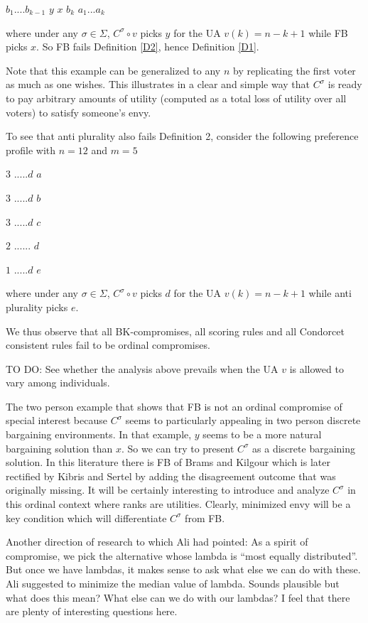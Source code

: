 \documentclass[version=3.21, pagesize, notitlepage, twoside=off, bibliography=totoc, DIV=calc, fontsize=12pt, a4paper]{scrartcl}
\begin{document}
$b_{1}....b_{k-1}$ $y$ $x$ $b_{k}$ $a_{1}...a_{k}$

\bigskip

where under any $\sigma \in \Sigma $, $C^{\sigma }\circ v$ picks $y$ for the
UA $v(k)=n-k+1$ while FB picks $x$. So FB fails Definition \ref{D2}, hence
Definition \ref{D1}.

Note that this example can be generalized to any $n$ by replicating the
first voter as much as one wishes. This illustrates in a clear and simple
way that $C^{\sigma }$ is ready to pay arbitrary amounts of utility
(computed as a total loss of utility over all voters) to satisfy someone's
envy.

To see that anti plurality also fails Definition 2, consider the following
preference profile with $n=12$ and $m=5$

$3$ $.....d$ $a$

$3$ $.....d$ $b$

$3$ $.....d$ $c$

$2$ $......$ $d$

$1$ $.....d$ $e$

\bigskip

where under any $\sigma \in \Sigma $, $C^{\sigma }\circ v$ picks $d$ for the
UA $v(k)=n-k+1$ while anti plurality picks $e$.

We thus observe that all BK-compromises, all scoring rules and all Condorcet
consistent rules fail to be ordinal compromises.

TO DO: See whether the analysis above prevails when the UA $v$ is allowed to
vary among individuals.

The two person example that shows that FB is not an ordinal compromise of
special interest because $C^{\sigma }$ seems to particularly appealing in
two person discrete bargaining environments. In that example, $y$ seems to
be a more natural bargaining solution than $x$. So we can try to present $%
C^{\sigma }$ as a discrete bargaining solution. In this literature there is
FB of Brams and Kilgour which is later rectified by Kibris and Sertel by
adding the disagreement outcome that was originally missing. It will be
certainly interesting to introduce and analyze $C^{\sigma }$ in this ordinal
context where ranks are utilities. Clearly, minimized envy will be a key
condition which will differentiate $C^{\sigma }$ from FB.

Another direction of research to which Ali had pointed: As a spirit of
compromise, we pick the alternative whose lambda is \textquotedblleft most
equally distributed\textquotedblright . But once we have lambdas, it makes
sense to ask what else we can do with these. Ali suggested to minimize the
median value of lambda. Sounds plausible but what does this mean? What else
can we do with our lambdas? I feel that there are plenty of interesting
questions here.

\bigskip
\end{document}
